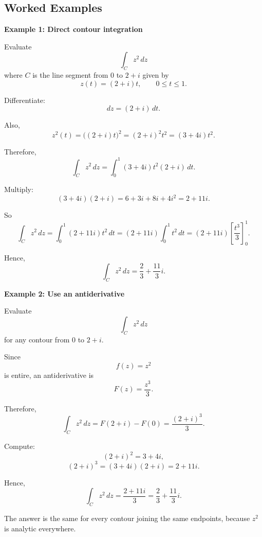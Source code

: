 \subsection*{Worked Examples}

\begin{examplebox}
    \textbf{Example 1: Direct contour integration}

    Evaluate
    \[
        \int_C z^2\,dz
    \]
    where $C$ is the line segment from $0$ to $2+i$ given by
    \[
        z(t)=(2+i)t,\qquad 0\le t\le 1.
    \]

    Differentiate:
    \[
        dz=(2+i)\,dt.
    \]

    Also,
    \[
        z^2(t)=\big((2+i)t\big)^2=(2+i)^2t^2=(3+4i)t^2.
    \]

    Therefore,
    \[
        \int_C z^2\,dz
        =
        \int_0^1 (3+4i)t^2(2+i)\,dt.
    \]

    Multiply:
    \[
        (3+4i)(2+i)=6+3i+8i+4i^2=2+11i.
    \]

    So
    \[
        \int_C z^2\,dz
        =
        \int_0^1 (2+11i)t^2\,dt
        =
        (2+11i)\int_0^1 t^2\,dt
        =
        (2+11i)\left[\frac{t^3}{3}\right]_0^1.
    \]

    Hence,
    \[
        \int_C z^2\,dz=\frac{2}{3}+\frac{11}{3}i.
    \]
\end{examplebox}

\begin{examplebox}
    \textbf{Example 2: Use an antiderivative}

    Evaluate
    \[
        \int_C z^2\,dz
    \]
    for any contour from $0$ to $2+i$.

    Since
    \[
        f(z)=z^2
    \]
    is entire, an antiderivative is
    \[
        F(z)=\frac{z^3}{3}.
    \]

    Therefore,
    \[
        \int_C z^2\,dz = F(2+i)-F(0)=\frac{(2+i)^3}{3}.
    \]

    Compute:
    \[
        (2+i)^2=3+4i,
    \]
    \[
        (2+i)^3=(3+4i)(2+i)=2+11i.
    \]

    Hence,
    \[
        \int_C z^2\,dz=\frac{2+11i}{3}
        =
        \frac{2}{3}+\frac{11}{3}i.
    \]

    The answer is the same for every contour joining the same endpoints, because $z^2$ is analytic everywhere.
\end{examplebox}

